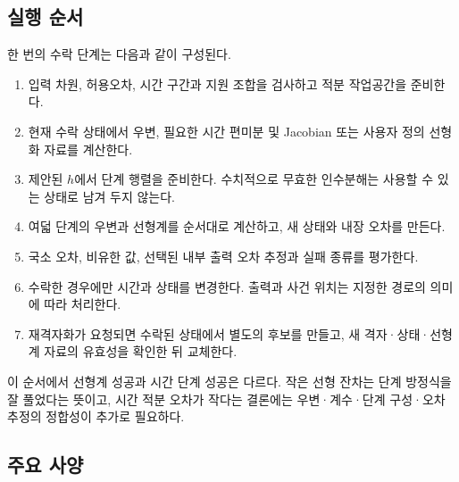 \documentclass[
  10pt,
  a4paper,
]{article}
\providecommand{\tightlist}{%
  \setlength{\itemsep}{0pt}\setlength{\parskip}{0pt}}
\begin{document}
\hypertarget{uxc2e4uxd589-uxc21cuxc11c}{%
\subsection{실행 순서}\label{uxc2e4uxd589-uxc21cuxc11c}}

한 번의 수락 단계는 다음과 같이 구성된다.

\begin{enumerate}
\def\labelenumi{\arabic{enumi}.}
\tightlist
\item
  입력 차원, 허용오차, 시간 구간과 지원 조합을 검사하고 적분 작업공간을
  준비한다.
\item
  현재 수락 상태에서 우변, 필요한 시간 편미분 및 Jacobian 또는 사용자
  정의 선형화 자료를 계산한다.
\item
  제안된 \(h\)에서 단계 행렬을 준비한다. 수치적으로 무효한 인수분해는
  사용할 수 있는 상태로 남겨 두지 않는다.
\item
  여덟 단계의 우변과 선형계를 순서대로 계산하고, 새 상태와 내장 오차를
  만든다.
\item
  국소 오차, 비유한 값, 선택된 내부 출력 오차 추정과 실패 종류를
  평가한다.
\item
  수락한 경우에만 시간과 상태를 변경한다. 출력과 사건 위치는 지정한
  경로의 의미에 따라 처리한다.
\item
  재격자화가 요청되면 수락된 상태에서 별도의 후보를 만들고, 새
  격자·상태·선형계 자료의 유효성을 확인한 뒤 교체한다.
\end{enumerate}

이 순서에서 선형계 성공과 시간 단계 성공은 다르다. 작은 선형 잔차는 단계
방정식을 잘 풀었다는 뜻이고, 시간 적분 오차가 작다는 결론에는
우변·계수·단계 구성·오차 추정의 정합성이 추가로 필요하다.

\hypertarget{uxc8fcuxc694-uxc0acuxc591}{%
\subsection{주요 사양}\label{uxc8fcuxc694-uxc0acuxc591}}
\end{document}
